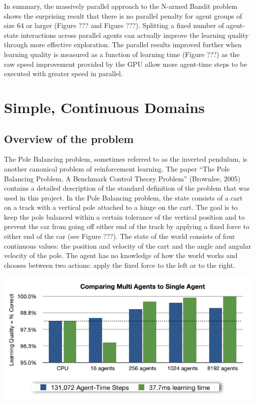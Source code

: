 \documentclass[11pt]{article} %
\begin{document}
\begin{flushleft}


In summary, the massively parallel approach to the N-armed Bandit problem shows the surprising result that there is no parallel penalty for agent groups of size 64 or larger (Figure ??? and Figure ???).  Splitting a fixed number of agent-state interactions across parallel agents can actually improve the learning quality through more effective exploration.  The parallel results improved further when learning quality is measured as a function of learning time (Figure ???) as the raw speed improvement provided by the GPU allow more agent-time steps to be executed with greater speed in parallel.



\section{Simple, Continuous Domains}
\subsection{Overview of the problem}
The Pole Balancing problem, sometimes referred to as the inverted pendulum, is another canonical problem of reinforcement learning.  The paper “The Pole Balancing Problem, A Benchmark Control Theory Problem” (Brownlee, 2005) contains a detailed description of the standard definition of the problem that was used in this project.  In the Pole Balancing problem, the state consists of a cart on a track with a vertical pole attached to a hinge on the cart.  The goal is to keep the pole balanced within a certain tolerance of the vertical position and to prevent the car from going off either end of the track by applying a fixed force to either end of the car (see Figure ???).  The state of the world consists of four continuous values: the position and velocity of the cart and the angle and angular velocity of the pole.  The agent has no knowledge of how the world works and chooses between two actions: apply the fixed force to the left or to the right.

\end{flushleft}
\center
\includegraphics[scale=0.8]{fig05}
\end{document}
